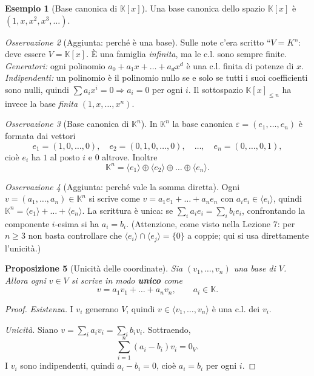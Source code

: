 \documentclass[11pt,a4paper]{article}
\newcommand{\KK}{\mathbb{K}}
\theoremstyle{plain}
\newtheorem{prop}{Proposizione}[section]
\theoremstyle{definition}
\newtheorem{esempio}[prop]{Esempio}
\theoremstyle{remark}
\newtheorem{oss}[prop]{Osservazione}
\begin{document}
\begin{esempio}[{Base canonica di $\KK[x]$}]
Una base canonica dello spazio $\KK[x]$ è
$(1,x,x^2,x^3,\dots)$.
\end{esempio}

\begin{oss}[Aggiunta: perché è una base]
Sulle note c'era scritto ``$V=K$'': deve essere $V=\KK[x]$. È una famiglia \emph{infinita}, ma le c.l. sono sempre finite.
\emph{Generatori:} ogni polinomio $a_0+a_1x+\dots+a_dx^d$ è una c.l. finita di potenze di $x$.
\emph{Indipendenti:} un polinomio è il polinomio nullo se e solo se tutti i suoi coefficienti sono nulli, quindi $\sum a_ix^i=0\Rightarrow a_i=0$ per ogni $i$.
Il sottospazio $\KK[x]_{\le n}$ ha invece la base \emph{finita} $(1,x,\dots,x^n)$.
\end{oss}

\begin{oss}[Base canonica di $\KK^n$]
In $\KK^n$ la base canonica $\varepsilon=(e_1,\dots,e_n)$ è formata dai vettori
\[
  e_1=(1,0,\dots,0),\quad e_2=(0,1,0,\dots,0),\quad\dots,\quad e_n=(0,\dots,0,1),
\]
cioè $e_i$ ha $1$ al posto $i$ e $0$ altrove. Inoltre
\[
  \KK^n=\langle e_1\rangle\oplus\langle e_2\rangle\oplus\dots\oplus\langle e_n\rangle .
\]
\end{oss}

\begin{oss}[Aggiunta: perché vale la somma diretta]
Ogni $v=(a_1,\dots,a_n)\in\KK^n$ si scrive come
$v=a_1e_1+\dots+a_ne_n$ con $a_ie_i\in\langle e_i\rangle$, quindi $\KK^n=\langle e_1\rangle+\dots+\langle e_n\rangle$.
La scrittura è unica: se $\sum_i a_ie_i=\sum_i b_ie_i$, confrontando la componente $i$-esima si ha $a_i=b_i$.
(Attenzione, come visto nella Lezione 7: per $n\ge3$ non basta controllare che $\langle e_i\rangle\cap\langle e_j\rangle=\{0\}$ a coppie; qui si usa direttamente l'unicità.)
\end{oss}

\begin{prop}[Unicità delle coordinate]\label{prop:coordinate}
Sia $(v_1,\dots,v_n)$ una base di $V$. Allora ogni $v\in V$ si scrive in modo \textbf{unico} come
\[
  v=a_1v_1+\dots+a_nv_n,\qquad a_i\in\KK .
\]
\end{prop}

\begin{proof}
\emph{Esistenza.} I $v_i$ generano $V$, quindi $v\in\langle v_1,\dots,v_n\rangle$ è una c.l. dei $v_i$.

\emph{Unicità.} Siano $v=\sum_ia_iv_i=\sum_ib_iv_i$. Sottraendo,
\[
  \sum_{i=1}^n(a_i-b_i)v_i=0_V .
\]
I $v_i$ sono indipendenti, quindi $a_i-b_i=0$, cioè $a_i=b_i$ per ogni $i$.
\end{proof}
\end{document}
